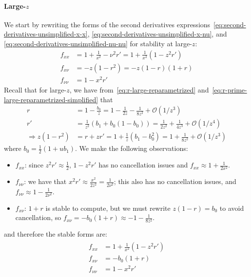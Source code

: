 \documentclass{article}
\begin{document}
\paragraph{Large-$z$}

We start by rewriting the forms of the second derivatives expressions~\eqref{eq:second-derivatives-unsimplified-x-x}, \eqref{eq:second-derivatives-unsimplified-x-nu}, and \eqref{eq:second-derivatives-unsimplified-nu-nu} for stability at large-$z$:
%
\begin{align}
  f_{xx}     & = 1 + \frac{1}{x^2} - \nu^2 r' = 1 + \frac{1}{x^2}(1 - z^2 r') \\
  f_{x\nu}   & = -z(1 - r^2) = -z (1 - r) (1 + r)                             \\
  f_{\nu\nu} & = 1 - x^2 r'
\end{align}
%
Recall that for large-$z$, we have from~\eqref{eq:r-large-reparametrized} and~\eqref{eq:r-prime-large-reparametrized-simplified} that
\begin{align}
  r                      & = 1 - \frac{b_0}{z} = 1 - \frac{1}{2z} - \frac{1}{8z^2} + \mathcal{O}(1/z^3)                \\
  r'                     & = \frac{1}{z^2} (b_1 + b_0(1 - b_0)) = \frac{1}{2z^2} + \frac{1}{4z^3} + \mathcal{O}(1/z^4) \\
  \Rightarrow z(1 - r^2) & = r + z r' = 1 + \frac{1}{z} (b_1 - b_0^2) = 1 + \frac{1}{8z^2} + \mathcal{O}(1/z^3)
\end{align}
where $b_0 = \frac{1}{2} (1 + u b_1)$.
%
We make the following observations:
%
\begin{itemize}
  \item $f_{xx}$: since $z^2 r' \approx \frac{1}{2}$, $1 - z^2 r'$ has no cancellation issues and $f_{xx} \approx 1 + \frac{1}{2x^2}$.
  \item $f_{\nu\nu}$: we have that $x^2 r' \approx \frac{x^2}{2z^2} = \frac{1}{2\nu^2}$; this also has no cancellation issues, and $f_{\nu\nu} \approx 1 - \frac{1}{2\nu^2}$.
  \item $f_{x\nu}$: $1 + r$ is stable to compute, but we must rewrite $z(1 - r) = b_0$ to avoid cancellation, so $f_{x\nu} = -b_0(1 + r) \approx -1 - \frac{1}{8z^2}$.
\end{itemize}
%
and therefore the stable forms are:
%
\begin{align}\label{eq:second-derivatives-large-z}
  \boxed{
    \begin{aligned}
      f_{xx}     & = 1 + \frac{1}{x^2}(1 - z^2 r') \\
      f_{x\nu}   & = -b_0 (1 + r)                  \\
      f_{\nu\nu} & = 1 - x^2 r'
    \end{aligned}
  }
\end{align}
\end{document}
